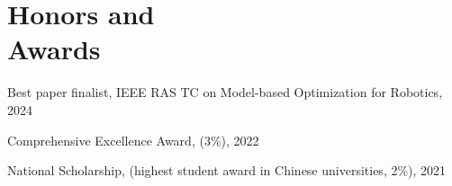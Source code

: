 
    \section{\mysidestyle Honors and\\Awards} 

    Best paper finalist, IEEE RAS TC on Model-based Optimization for Robotics, 2024

    Comprehensive Excellence Award, (3\%), 2022

    National Scholarship, (highest student award in Chinese universities, 2\%), 2021



    



    




